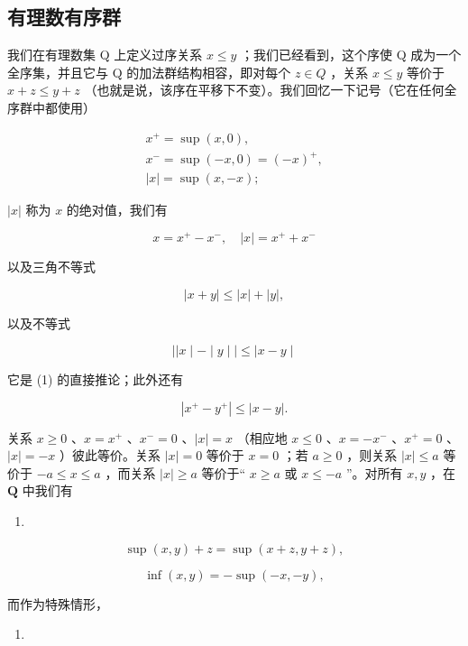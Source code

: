 \subsection{有理数有序群}

我们在有理数集 Q 上定义过序关系 \(x \leqslant y\) ；我们已经看到，这个序使 Q 成为一个全序集，并且它与 Q 的加法群结构相容，即对每个 \(z \in Q\) ，关系 \(x \leqslant y\) 等价于 \(x + z \leqslant y + z\) （也就是说，该序在平移下不变）。我们回忆一下记号（它在任何全序群中都使用）

\[
\begin{array}{l} x ^ {+} = \sup (x, 0), \\ x ^ {-} = \sup (- x, 0) = (- x) ^ {+}, \\ | x | = \sup (x, - x); \end{array}
\]

\(|x|\) 称为 \(x\) 的绝对值，我们有

\[
x = x ^ {+} - x ^ {-}, \quad | x | = x ^ {+} + x ^ {-}
\]

以及三角不等式

\[
| x + y | \leqslant | x | + | y |,\tag{1}
\]

以及不等式

\[
\mid | x \mid - \mid y \mid \mid \leqslant \mid x - y \mid\tag{2}
\]

它是 (1) 的直接推论；此外还有

\[
\left| x ^ {+} - y ^ {+} \right| \leqslant | x - y |.\tag{3}
\]

关系 \(x \geqslant 0\) 、\(x = x^{+}\) 、\(x^{-} = 0\) 、\(|x| = x\) （相应地 \(x \leqslant 0\) 、\(x = -x^{-}\) 、\(x^{+} = 0\) 、\(|x| = -x\) ）彼此等价。关系 \(|x| = 0\) 等价于 \(x = 0\) ；若 \(a \geqslant 0\) ，则关系 \(|x| \leqslant a\) 等价于 \(-a \leqslant x \leqslant a\) ，而关系 \(|x| \geqslant a\) 等价于“ \(x \geqslant a\) 或 \(x \leqslant -a\) ”。对所有 \(x, y\) ，在 \(\mathbf{Q}\) 中我们有

\begin{enumerate}
\def\labelenumi{(\arabic{enumi})}
\setcounter{enumi}{3}
\tightlist
\item
\end{enumerate}

\[
\sup (x, y) + z = \sup (x + z, y + z),\tag{4}
\]

\[
\inf (x, y) = - \sup (- x, - y),\tag{5}
\]

而作为特殊情形，

\begin{enumerate}
\def\labelenumi{(\arabic{enumi})}
\setcounter{enumi}{5}
\tightlist
\item
\end{enumerate}

